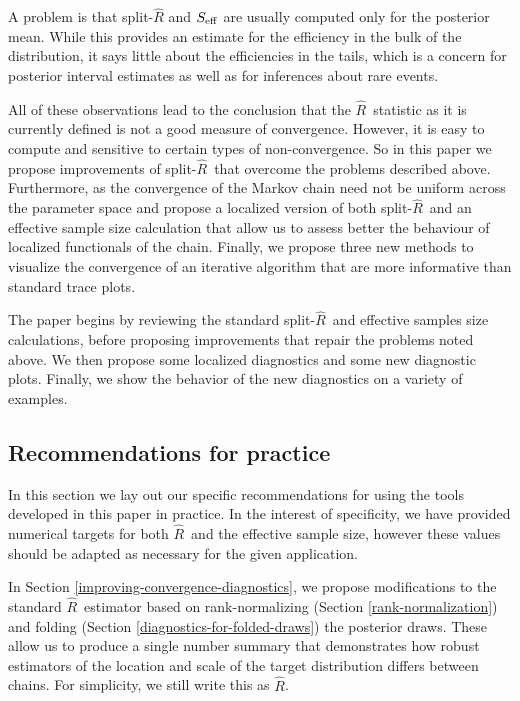 \documentclass[american,]{article}
\newcommand{\Rhat}{$\widehat{R}$}
\newcommand{\sRhat}{split-$\widehat{R}$}
\begin{document}
A problem is that split-\(\widehat{R}\) and \(S_{\rm eff}\) are 
usually computed only for the posterior mean. While this provides an estimate 
for the efficiency in the bulk of the distribution, it says little about the 
efficiencies in the tails, which is a concern for posterior 
interval estimates as well as for inferences about rare events.

All of these observations lead to the conclusion that the \Rhat\ statistic as it is 
currently defined is not a good measure of convergence. However, it is 
easy to compute and sensitive to certain types of non-convergence. So 
in this paper  we propose improvements of 
\sRhat\ that overcome the  
problems described above. Furthermore, as the convergence
of the Markov chain need not be uniform across the parameter space
and propose a localized version of both \sRhat\ and an effective sample size 
calculation that allow us to assess better the behaviour of localized 
functionals of the chain. Finally, we propose three new methods to visualize the 
convergence of an iterative algorithm that are more informative than standard 
trace plots.

The paper begins by reviewing the standard \sRhat\ and effective samples size calculations, before proposing improvements that repair the problems noted above. We then propose some localized diagnostics and some new diagnostic plots. Finally, we show the behavior of the new diagnostics on a variety of examples.


\subsection{Recommendations for practice}
In this section we lay out our specific recommendations for using the tools 
developed in this paper in practice. In the interest of specificity, we have provided
numerical targets for both \Rhat\ and the effective sample size, however
these values should be adapted as necessary for the given application.

In Section \ref{improving-convergence-diagnostics}, we propose modifications to the 
standard \Rhat\ estimator based on rank-normalizing (Section 
\ref{rank-normalization}) and folding (Section
 \ref{diagnostics-for-folded-draws}) the posterior draws.
These allow us to produce a single number summary  that demonstrates how
 robust estimators of the location and scale of the target distribution differs
 between chains.  For simplicity, we still write this as \Rhat .
 
\end{document}
